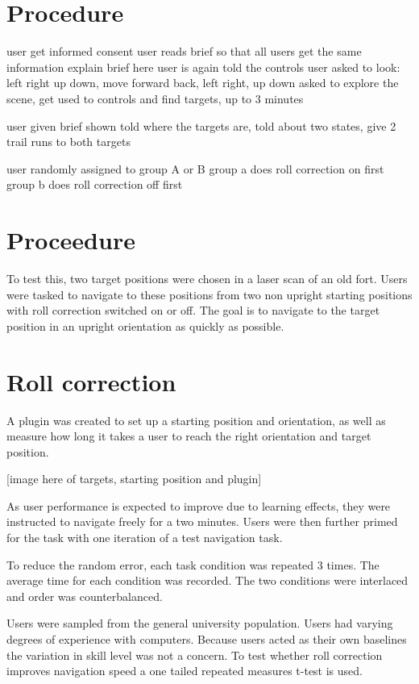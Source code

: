 \section{Procedure}
user get informed consent
user reads brief so that all users get the same information
explain brief here
user is again told the controls
user asked to look: left right up down, move forward back, left right, up down
asked to explore the scene, get used to controls and find targets, up to 3 minutes

user given brief shown told where the targets are, told about two states, give 2 trail runs to both targets

user randomly assigned to group A or B
group a does roll correction on first
group b does roll correction off first




\section{Proceedure}

To test this, two target positions were chosen in a laser scan of an old fort. Users were tasked to navigate to these positions from two non upright starting positions with roll correction switched on or off. The goal is to navigate to the target position in an upright orientation as quickly as possible.

\section{Roll correction}



A plugin was created to set up a starting position and orientation, as well as measure how long it takes a user to reach the right orientation and target position.

[image here of targets, starting position and plugin]

As user performance is expected to improve due to learning effects, they were instructed to navigate freely for a two minutes. Users were then further primed for the task with one iteration of a test navigation task.

To reduce the random error, each task condition was repeated 3 times. The average time for each condition was recorded. The two conditions were interlaced and order was counterbalanced.

Users were sampled from the general university population. Users had varying degrees of experience with computers. Because users acted as their own baselines the variation in skill level was not a concern. To test whether roll correction improves navigation speed a one tailed repeated measures t-test is used.

